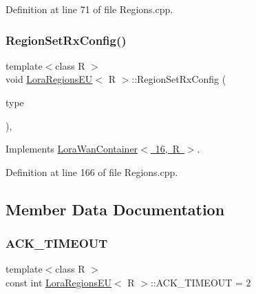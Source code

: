 Definition at line 71 of file Regions.\+cpp.

\mbox{\label{class_lora_regions_e_u_a1222a9362e7ba3715d9848af850af3f0}} 
\subsubsection{\texorpdfstring{Region\+Set\+Rx\+Config()}{RegionSetRxConfig()}}
{\footnotesize\ttfamily template$<$class R $>$ \\
void \mbox{\hyperlink{class_lora_regions_e_u}{Lora\+Regions\+EU}}$<$ R $>$\+::Region\+Set\+Rx\+Config (\begin{DoxyParamCaption}\item[{\mbox{\hyperlink{_define_8h_ab894a4c21b8aae9e9c68d8c426a66956}{e\+Rx\+Win\+Type}}}]{type }\end{DoxyParamCaption})\hspace{0.3cm}{\ttfamily [protected]}, {\ttfamily [virtual]}}



Implements \mbox{\hyperlink{class_lora_wan_container_a6d9c6a90a373153f95897951b877d826}{Lora\+Wan\+Container$<$ 16, R $>$}}.



Definition at line 166 of file Regions.\+cpp.



\subsection{Member Data Documentation}
\mbox{\label{class_lora_regions_e_u_ae52a86b43d3428a3cc74dbf44d223cd3}} 
\subsubsection{\texorpdfstring{A\+C\+K\+\_\+\+T\+I\+M\+E\+O\+UT}{ACK\_TIMEOUT}}
{\footnotesize\ttfamily template$<$class R $>$ \\
const int \mbox{\hyperlink{class_lora_regions_e_u}{Lora\+Regions\+EU}}$<$ R $>$\+::A\+C\+K\+\_\+\+T\+I\+M\+E\+O\+UT = 2\hspace{0.3cm}{\ttfamily [static]}}



